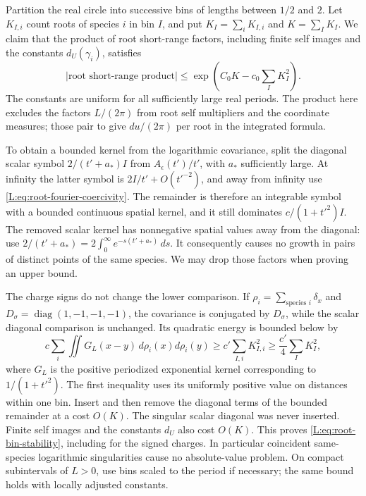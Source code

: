 \documentclass[11pt]{article}
\numberwithin{equation}{section}
\theoremstyle{definition}\newtheorem{definition}[theorem]{Definition}
\theoremstyle{remark}\newtheorem{remark}[theorem]{Remark}
\begin{document}
Partition the real circle into successive bins of lengths between
$1/2$ and $2$. Let $K_{I,i}$ count roots of species $i$ in bin $I$, and
put $K_I=\sum_iK_{I,i}$ and $K=\sum_IK_I$. We claim that the product of
root short-range factors, including finite self images and the constants $d_U(\gamma_i)$,
satisfies
\begin{equation}\label{L:eq:root-bin-stability}
 \left|\text{root short-range product}\right|
 \le \exp\left(C_0K-c_0\sum_IK_I^2\right).
\end{equation}
The constants are uniform for all sufficiently large real periods.
The product here excludes the factors $L/(2\pi)$ from root self
multipliers and the coordinate measures; those pair to give $du/(2\pi)$
per root in the integrated formula.

To obtain a bounded kernel from the logarithmic covariance, split the
diagonal scalar symbol $2/(t'+a_*)I$ from $A_\epsilon(t')/t'$, with
$a_*$ sufficiently large. At infinity the latter symbol is
$2I/t'+O(t'^{-2})$, and away from infinity use
\eqref{L:eq:root-fourier-coercivity}. The remainder is therefore an
integrable symbol with a bounded continuous spatial kernel, and it
still dominates $c/(1+t'^2)I$. The removed scalar kernel has nonnegative
spatial values away from the diagonal: use
$2/(t'+a_*)=2\int_0^\infty e^{-s(t'+a_*)}\,ds$. It consequently causes no growth in
pairs of distinct points of the same species. We may drop those factors
when proving an upper bound.

The charge signs do not change the lower comparison. If
$\rho_i=\sum_{\text{species }i}\delta_x$ and
$D_\sigma=\operatorname{diag}(1,-1,-1,-1)$, the covariance is conjugated by $D_\sigma$,
while the scalar diagonal comparison is unchanged. Its quadratic energy
is bounded below by
\[
 c\sum_i\iint G_L(x-y)\,d\rho_i(x)d\rho_i(y)
 \ge c'\sum_{I,i}K_{I,i}^2
 \ge\frac{c'}4\sum_IK_I^2,
\]
where $G_L$ is the positive periodized exponential kernel corresponding
to $1/(1+t'^2)$. The first inequality uses its uniformly positive value
on distances within one bin. Insert and then remove the diagonal terms
of the bounded remainder at a cost $O(K)$. The singular scalar diagonal
was never inserted. Finite self images and the constants $d_U$ also cost
$O(K)$. This proves \eqref{L:eq:root-bin-stability}, including for the
signed charges. In particular coincident same-species logarithmic
singularities cause no absolute-value problem. On compact subintervals
of $L>0$, use bins scaled to the period if necessary; the same bound
holds with locally adjusted constants.
\end{document}
